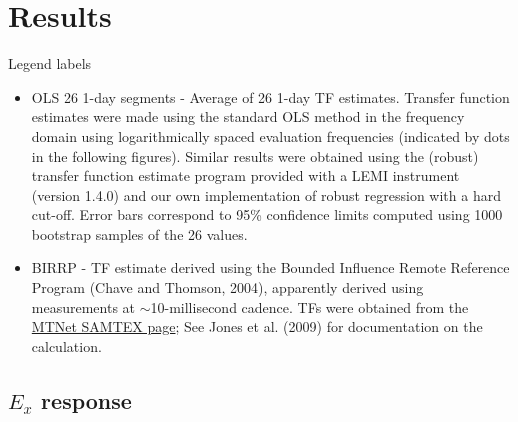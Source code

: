 \documentclass{article}
\begin{document}
\clearpage

\section{Results}

Legend labels

\begin{itemize}

    \item OLS 26 1-day segments - Average of 26 1-day TF estimates. Transfer function estimates were made using the standard OLS method in the frequency domain using logarithmically spaced evaluation frequencies (indicated by dots in the following figures). Similar results were obtained using the (robust) transfer function estimate program provided with a LEMI instrument (version 1.4.0) and our own implementation of robust regression with a hard cut-off. Error bars correspond to 95\% confidence limits computed using 1000 bootstrap samples of the 26 values.

    \item BIRRP - TF estimate derived using the Bounded Influence Remote Reference Program (Chave and Thomson, 2004), apparently derived using measurements at $\sim$10-millisecond cadence. TFs were obtained from the \href{https://www.mtnet.info/data/samtex/samtex.html}{MTNet SAMTEX page}; See Jones et al. (2009) for documentation on the calculation.

\end{itemize}

\clearpage

\subsection{$E_x$ response}
\end{document}
